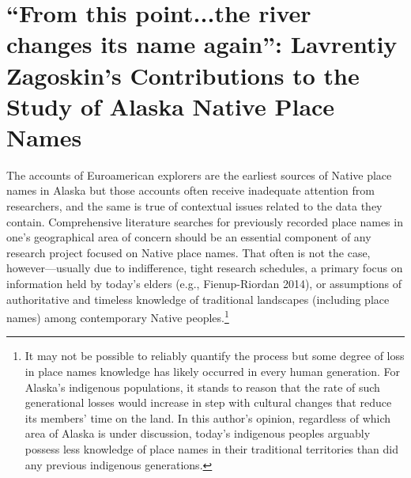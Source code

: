 \chapter[“From this point...the river changes its name again”: Lavrentiy Zagoskin’s Contributions to the Study of Alaska Native Place Names]{\vspace{-25pt}“From this point...the river changes its name again”: Lavrentiy Zagoskin’s Contributions to the Study of Alaska Native Place Names}



\def\authorlast{Pratt}


\renewcommand{\beginchapter}{\pageref{pratt-ch-begin}}
\renewcommand{\finishchapter}{\pageref{pratt-ch-end}}
\label{pratt-ch-begin}



\thispagestyle{firststyle}



The accounts of Euroamerican explorers are the earliest sources of Native place names in Alaska but those accounts often receive inadequate attention from researchers, and the same is true of contextual issues related to the data they contain. Comprehensive literature searches for previously recorded place names in one’s geographical area of concern should be an essential component of any research project focused on Native place names. That often is not the case, however---usually due to indifference, tight research schedules, a primary focus on information held by today’s elders (e.g., Fienup-Riordan 2014), or assumptions of authoritative and timeless knowledge of traditional landscapes (including place names) among contemporary Native peoples.\footnote{It may not be possible to reliably quantify the process but some degree of loss in place names knowledge has likely occurred in every human generation. For Alaska’s indigenous populations, it stands to reason that the rate of such generational losses would increase in step with cultural changes that reduce its members’ time on the land. In this author’s opinion, regardless of which area of Alaska is under discussion, today’s indigenous peoples arguably possess less knowledge of place names in their traditional territories than did any previous indigenous generations.}

